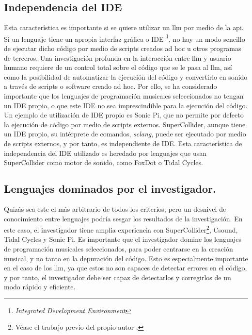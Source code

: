\subsection{Independencia del IDE}
Esta característica es importante si se quiere utilizar un \gls{llm} por medio de la \gls{api}. Si un lenguaje tiene un apropia interfaz gráfica o IDE \footnote{\emph{Integrated Development Environment}}, no hay un modo sencillo de ejecutar dicho código por medio de scripts creados ad hoc u otros programas de terceros. Una investigación profunda en la interacción entre \gls{llm} y usuario humano requiere de un control total sobre el código que se le pasa al \gls{llm}, así como la posibilidad de automatizar la ejecución del código y convertirlo en sonido a través de scripts o software creado ad hoc. Por ello, se ha considerado importante que los lenguajes de programación musicales seleccionados no tengan un IDE propio, o que este IDE no sea imprescindible para la ejecución del código. Un ejemplo de utilización de IDE propio es {Sonic Pi}, que no permite por defecto la ejecución de código por medio de scripts externos. {SuperCollider}, aunque tiene un IDE propio, su intérprete de comandos, \emph{sclang}, puede ser ejecutado por medio de scripts externos, y por tanto, es independiente de IDE. Esta característica de independencia del IDE utilizado es heredado por lenguajes que usan {SuperCollider} como motor de sonido, como {FoxDot} o {Tidal Cycles}.

\subsection{Lenguajes dominados por el investigador.} 
Quizás sea este el más arbitrario de todos los criterios, pero un desnivel de conocimiento entre lenguajes podría sesgar los resultados de la investigación. En este caso, el investigador tiene amplia experiencia con {SuperCollider}\footnote{Véase el trabajo previo del propio autor \citep{guerraparraMesjetiuTFM_Arte_Sonoro_MEMORIA2020}.}, {Csound}, {Tidal Cycles} y {Sonic Pi}.
Es importante que el investigador domine los lenguajes de programación musicales seleccionados, para poder centrarse en la creación musical, y no tanto en la depuración del código. Esto es especialmente importante en el caso de los \gls{llm}, ya que estos no son capaces de detectar errores en el código, y por tanto, el investigador debe ser capaz de detectarlos y corregirlos de un modo rápido y eficiente.

